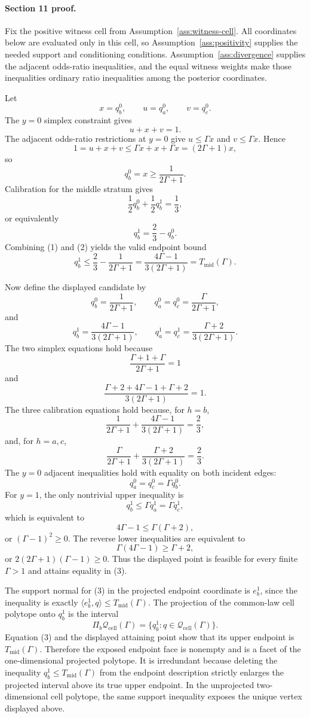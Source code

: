\paragraph{Section 11 proof.}
Fix the positive witness cell from Assumption~\ref{ass:witness-cell}.  All coordinates below are evaluated only in this cell, so Assumption~\ref{ass:positivity} supplies the needed support and conditioning conditions.  Assumption~\ref{ass:divergence} supplies the adjacent odds-ratio inequalities, and the equal witness weights make those inequalities ordinary ratio inequalities among the posterior coordinates.

Let
\[
  x=q_b^0,\qquad u=q_a^0,\qquad v=q_c^0.
\]
The \(y=0\) simplex constraint gives
\[
  u+x+v=1.
\]
The adjacent odds-ratio restrictions at \(y=0\) give \(u\le \Gamma x\) and \(v\le \Gamma x\).  Hence
\[
  1=u+x+v\le \Gamma x+x+\Gamma x=(2\Gamma+1)x,
\]
so
\[
  q_b^0=x\ge \frac{1}{2\Gamma+1}. \tag{1}
\]
Calibration for the middle stratum gives
\[
  \frac12 q_b^0+\frac12 q_b^1=\frac13,
\]
or equivalently
\[
  q_b^1=\frac23-q_b^0. \tag{2}
\]
Combining (1) and (2) yields the valid endpoint bound
\[
  q_b^1\le \frac23-\frac{1}{2\Gamma+1}
  =\frac{4\Gamma-1}{3(2\Gamma+1)}
  =T_{\mathrm{mid}}(\Gamma). \tag{3}
\]

Now define the displayed candidate by
\[
  q_b^0=\frac{1}{2\Gamma+1},\qquad
  q_a^0=q_c^0=\frac{\Gamma}{2\Gamma+1},
\]
and
\[
  q_b^1=\frac{4\Gamma-1}{3(2\Gamma+1)},\qquad
  q_a^1=q_c^1=\frac{\Gamma+2}{3(2\Gamma+1)}.
\]
The two simplex equations hold because
\[
  \frac{\Gamma+1+\Gamma}{2\Gamma+1}=1
\]
and
\[
  \frac{\Gamma+2+4\Gamma-1+\Gamma+2}{3(2\Gamma+1)}=1.
\]
The three calibration equations hold because, for \(h=b\),
\[
  \frac{1}{2\Gamma+1}+\frac{4\Gamma-1}{3(2\Gamma+1)}=\frac23,
\]
and, for \(h=a,c\),
\[
  \frac{\Gamma}{2\Gamma+1}+\frac{\Gamma+2}{3(2\Gamma+1)}=\frac23.
\]
The \(y=0\) adjacent inequalities hold with equality on both incident edges:
\[
  q_a^0=q_c^0=\Gamma q_b^0.
\]
For \(y=1\), the only nontrivial upper inequality is
\[
  q_b^1\le \Gamma q_a^1=\Gamma q_c^1,
\]
which is equivalent to
\[
  4\Gamma-1\le \Gamma(\Gamma+2),
\]
or \((\Gamma-1)^2\ge 0\).  The reverse lower inequalities are equivalent to
\[
  \Gamma(4\Gamma-1)\ge \Gamma+2,
\]
or \(2(2\Gamma+1)(\Gamma-1)\ge 0\).  Thus the displayed point is feasible for every finite \(\Gamma>1\) and attains equality in (3).

The support normal for (3) in the projected endpoint coordinate is \(e_b^1\), since the inequality is exactly \(\langle e_b^1,q\rangle\le T_{\mathrm{mid}}(\Gamma)\).  The projection of the common-law cell polytope onto \(q_b^1\) is the interval
\[
  \Pi_b\mathcal Q_{\mathrm{cell}}(\Gamma)
  =
  \{q_b^1:q\in\mathcal Q_{\mathrm{cell}}(\Gamma)\}.
\]
Equation (3) and the displayed attaining point show that its upper endpoint is \(T_{\mathrm{mid}}(\Gamma)\).  Therefore the exposed endpoint face is nonempty and is a facet of the one-dimensional projected polytope.  It is irredundant because deleting the inequality \(q_b^1\le T_{\mathrm{mid}}(\Gamma)\) from the endpoint description strictly enlarges the projected interval above its true upper endpoint.  In the unprojected two-dimensional cell polytope, the same support inequality exposes the unique vertex displayed above.

